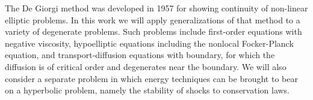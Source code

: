 \documentclass[11pt]{report}	%
\theoremstyle{definition}
\theoremstyle{remark}
\begin{document}
%
\utabstract
\indent
The De Giorgi method was developed in 1957 for showing continuity of non-linear elliptic problems.  In this work we will apply generalizations of that method to a variety of degenerate problems.  Such problems include first-order equations with negative viscosity, hypoelliptic equations including the nonlocal Focker-Planck equation, and transport-diffusion equations with boundary, for which the diffusion is of critical order and degenerates near the boundary.  We will also consider a separate problem in which energy techniques can be brought to bear on a hyperbolic problem, namely the stability of shocks to conservation laws.  



\tableofcontents   %




%
%





%








%
%
\appendix
%


%
%
%
%
\end{document}
